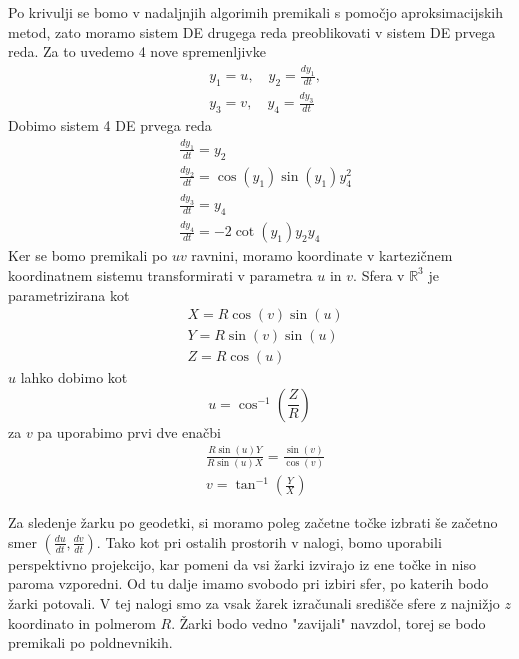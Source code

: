 \documentclass[titlepage]{article}
\begin{document}
Po krivulji se bomo v nadaljnjih algorimih premikali s pomočjo aproksimacijskih metod, zato moramo sistem DE drugega reda preoblikovati v
sistem DE prvega reda. Za to uvedemo 4 nove spremenljivke
\begin{equation}
\begin{split}
    &y_{1}=u, \quad y_{2}=\frac{dy_{1}}{dt}, \\
    &y_{3}=v, \quad y_{4}=\frac{dy_{3}}{dt}
\end{split}
\end{equation}
Dobimo sistem 4 DE prvega reda
\begin{equation} \label{e:geoSys}
\begin{split}
    &\frac{dy_{1}}{dt}=y_{2} \\
    &\frac{dy_{2}}{dt}=\cos(y_{1})\sin(y_{1})y^{2}_{4} \\
    &\frac{dy_{3}}{dt}=y_{4} \\
    &\frac{dy_{4}}{dt}=-2\cot(y_{1})y_{2}y_{4}
\end{split}
\end{equation}
Ker se bomo premikali po \( uv \) ravnini, moramo koordinate v kartezičnem koordinatnem sistemu transformirati v parametra \( u \) in \( v \). Sfera v \(\mathbb{R}^3\) je
parametrizirana kot
\begin{equation} \label{e:toXYZ}
    \begin{split}
        &X=R\cos(v)\sin(u) \\
        &Y=R\sin(v)\sin(u) \\
        &Z=R\cos(u)
    \end{split}
\end{equation}
\( u \) lahko dobimo kot
\begin{equation} \label{e:toU}
        u=\cos^{-1} \left( \frac{Z}{R} \right)
\end{equation}
za \( v \) pa uporabimo prvi dve enačbi
\begin{equation} \label{e:toV}
    \begin{split}
        &\frac{R\sin(u)Y}{R\sin(u)X}=\frac{\sin(v)}{\cos(v)} \\
        &v=\tan^{-1} \left(\frac{Y}{X} \right)
    \end{split}
\end{equation}

Za sledenje žarku po geodetki, si moramo poleg začetne točke izbrati še začetno smer
\(\left( \frac{du}{dt}, \frac{dv}{dt} \right) \). Tako kot pri ostalih prostorih v nalogi, 
bomo uporabili perspektivno projekcijo, kar pomeni da vsi žarki izvirajo iz ene točke in 
niso paroma vzporedni. Od tu dalje imamo svobodo pri izbiri sfer, po katerih bodo žarki potovali. V tej nalogi smo za
vsak žarek izračunali središče sfere z najnižjo \( z \) koordinato in polmerom \( R \). Žarki bodo vedno "zavijali" navzdol, torej se bodo premikali po poldnevnikih.
\end{document}
